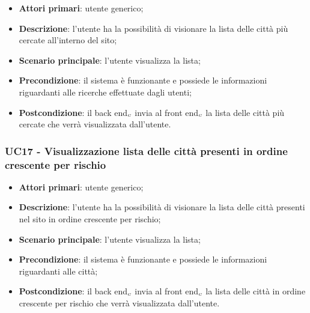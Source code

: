 \begin{itemize}
	\item \textbf{Attori primari}: utente generico;
	\item \textbf{Descrizione}: l'utente ha la possibilità di visionare la lista delle città più cercate all'interno del sito; 
	\item \textbf{Scenario principale}: l'utente visualizza la lista;
	\item \textbf{Precondizione}: il sistema è funzionante e possiede le informazioni riguardanti alle ricerche effettuate dagli utenti;
	\item \textbf{Postcondizione}: il back end$_{\scaleto{G}{3pt}}$ invia al front end$_{\scaleto{G}{3pt}}$ la lista delle città più cercate che verrà visualizzata dall'utente.
\end{itemize}

\subsubsection{UC17 - Visualizzazione lista delle città presenti in ordine crescente per rischio}\label{CasiDUsoCasiDUsoFacoltativiTraUnUtenteEIlFrontEndElencoCasiDUsoUC17VisualizzazioneListaDelleCittaPresentiInOrdineCrescentePerRischio}

\begin{itemize}
	\item \textbf{Attori primari}: utente generico;
	\item \textbf{Descrizione}: l'utente ha la possibilità di visionare la lista delle città presenti nel sito in ordine crescente per rischio; 
	\item \textbf{Scenario principale}: l'utente visualizza la lista;
	\item \textbf{Precondizione}:  il sistema è funzionante e possiede le informazioni riguardanti alle città;
	\item \textbf{Postcondizione}: il back end$_{\scaleto{G}{3pt}}$ invia al front end$_{\scaleto{G}{3pt}}$ la lista delle città in ordine crescente per rischio che verrà visualizzata dall'utente.
\end{itemize}
